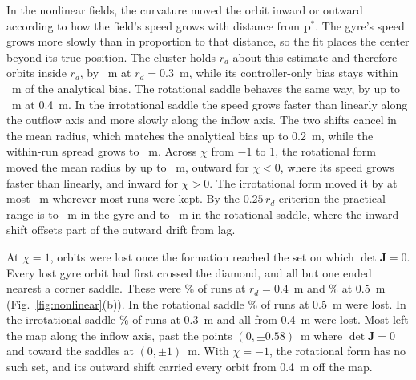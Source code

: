 \documentclass[lettersize,journal]{IEEEtran}
\begin{document}
In the nonlinear fields, the curvature moved the orbit inward or outward according to how the field's speed grows with distance from $\mathbf{p}^*$. The gyre's speed grows more slowly than in proportion to that distance, so the fit places the center beyond its true position. The cluster holds $r_d$ about this estimate and therefore orbits inside $r_d$, by ~m at $r_d = 0.3$~m, while its controller-only bias stays within ~m of the analytical bias. The rotational saddle behaves the same way, by up to ~m at 0.4~m. In the irrotational saddle the speed grows faster than linearly along the outflow axis and more slowly along the inflow axis. The two shifts cancel in the mean radius, which matches the analytical bias up to 0.2~m, while the within-run spread grows to ~m. Across $\chi$ from $-1$ to 1, the rotational form moved the mean radius by up to ~m, outward for $\chi < 0$, where its speed grows faster than linearly, and inward for $\chi > 0$. The irrotational form moved it by at most ~m wherever most runs were kept. By the $0.25\,r_d$ criterion the practical range is  to ~m in the gyre and  to ~m in the rotational saddle, where the inward shift offsets part of the outward drift from lag. %

At $\chi = 1$, orbits were lost once the formation reached the set on which $\det\mathbf{J} = 0$. Every lost gyre orbit had first crossed the diamond, and all but one ended nearest a corner saddle. These were \% of runs at $r_d = 0.4$~m and \% at 0.5~m (Fig.~\ref{fig:nonlinear}(b)). In the rotational saddle \% of runs at 0.5~m were lost. In the irrotational saddle \% of runs at 0.3~m and all from 0.4~m were lost. Most left the map along the inflow axis, past the points $(0, \pm 0.58)$~m where $\det\mathbf{J} = 0$ and toward the saddles at $(0, \pm 1)$~m. With $\chi = -1$, the rotational form has no such set, and its outward shift carried every orbit from 0.4~m off the map. %
\end{document}
